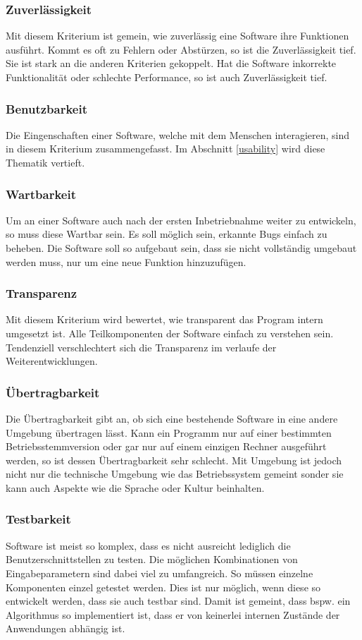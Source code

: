 \subsubsection{Zuverlässigkeit}
Mit diesem Kriterium ist gemein, wie zuverlässig eine Software ihre Funktionen ausführt.
Kommt es oft zu Fehlern oder Abstürzen, so ist die Zuverlässigkeit tief.
Sie ist stark an die anderen Kriterien gekoppelt.
Hat die Software inkorrekte Funktionalität oder schlechte Performance, so ist auch Zuverlässigkeit tief.

\subsubsection{Benutzbarkeit}
Die Eingenschaften einer Software, welche mit dem Menschen interagieren, sind in diesem Kriterium zusammengefasst.
Im Abschnitt \ref{usability} wird diese Thematik vertieft.

\subsubsection{Wartbarkeit}
Um an einer Software auch nach der ersten Inbetriebnahme weiter zu entwickeln, so muss diese Wartbar sein.
Es soll möglich sein, erkannte Bugs einfach zu beheben.
Die Software soll so aufgebaut sein, dass sie nicht vollständig umgebaut werden muss, nur um eine neue Funktion hinzuzufügen.


\subsubsection{Transparenz}
Mit diesem Kriterium wird bewertet, wie transparent das Program intern umgesetzt ist.
Alle Teilkomponenten der Software einfach zu verstehen sein.
Tendenziell verschlechtert sich die Transparenz im verlaufe der Weiterentwicklungen.


\subsubsection{Übertragbarkeit}
Die Übertragbarkeit gibt an, ob sich eine bestehende Software in eine andere Umgebung übertragen lässt.
Kann ein Programm nur auf einer bestimmten Betriebsstemmversion oder gar nur auf einem einzigen Rechner ausgeführt werden, so ist dessen Übertragbarkeit sehr schlecht.
Mit Umgebung ist jedoch nicht nur die technische Umgebung wie das Betriebssystem gemeint sonder sie kann auch Aspekte wie die Sprache oder Kultur beinhalten.

\subsubsection{Testbarkeit}
Software ist meist so komplex, dass es nicht ausreicht lediglich die Benutzerschnittstellen zu testen.
Die möglichen Kombinationen von Eingabeparametern sind dabei viel zu umfangreich.
So müssen einzelne Komponenten einzel getestet werden.
Dies ist nur möglich, wenn diese so entwickelt werden, dass sie auch testbar sind.
Damit ist gemeint, dass bspw. ein Algorithmus so implementiert ist, dass er von keinerlei internen Zustände der Anwendungen abhängig ist. 


